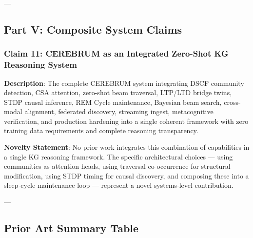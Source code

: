 \documentclass[10pt,journal,compsoc]{IEEEtran}
\begin{document}
---

\subsection{Part V: Composite System Claims}

\subsubsection{Claim 11: CEREBRUM as an Integrated Zero-Shot KG Reasoning System}

\textbf{Description}: The complete CEREBRUM system integrating DSCF community detection, CSA attention, zero-shot beam traversal, LTP/LTD bridge twins, STDP causal inference, REM Cycle maintenance, Bayesian beam search, cross-modal alignment, federated discovery, streaming ingest, metac\-ognitive verif\-ication, and production hardening into a single coherent framework with zero training data requi\-rements and complete reasoning trans\-parency.

\textbf{Novelty Statement}: No prior work integrates this combination of capab\-ilities in a single KG reasoning framework. The specific archi\-tectural choices — using communities as attention heads, using traversal co-occurrence for structural modif\-ication, using STDP timing for causal discovery, and composing these into a sleep-cycle maintenance loop — represent a novel systems-level contr\-ibution.

---

\subsection{Prior Art Summary Table}
\end{document}
